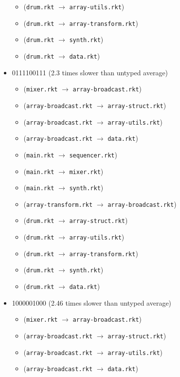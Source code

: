 \documentclass{article}
\newcommand{\mono}[1]{\texttt{#1}}
\begin{document}
\begin{itemize}
\begin{itemize}
  \item (\mono{drum.rkt} $\rightarrow$ \mono{array-utils.rkt})
  \item (\mono{drum.rkt} $\rightarrow$ \mono{array-transform.rkt})
  \item (\mono{drum.rkt} $\rightarrow$ \mono{synth.rkt})
  \item (\mono{drum.rkt} $\rightarrow$ \mono{data.rkt})
  \end{itemize}
\item 0111100111 (2.3 times slower than untyped average)
  \begin{itemize}
  \item (\mono{mixer.rkt} $\rightarrow$ \mono{array-broadcast.rkt})
  \item (\mono{array-broadcast.rkt} $\rightarrow$ \mono{array-struct.rkt})
  \item (\mono{array-broadcast.rkt} $\rightarrow$ \mono{array-utils.rkt})
  \item (\mono{array-broadcast.rkt} $\rightarrow$ \mono{data.rkt})
  \item (\mono{main.rkt} $\rightarrow$ \mono{sequencer.rkt})
  \item (\mono{main.rkt} $\rightarrow$ \mono{mixer.rkt})
  \item (\mono{main.rkt} $\rightarrow$ \mono{synth.rkt})
  \item (\mono{array-transform.rkt} $\rightarrow$ \mono{array-broadcast.rkt})
  \item (\mono{drum.rkt} $\rightarrow$ \mono{array-struct.rkt})
  \item (\mono{drum.rkt} $\rightarrow$ \mono{array-utils.rkt})
  \item (\mono{drum.rkt} $\rightarrow$ \mono{array-transform.rkt})
  \item (\mono{drum.rkt} $\rightarrow$ \mono{synth.rkt})
  \item (\mono{drum.rkt} $\rightarrow$ \mono{data.rkt})
  \end{itemize}
\item 1000001000 (2.46 times slower than untyped average)
  \begin{itemize}
  \item (\mono{mixer.rkt} $\rightarrow$ \mono{array-broadcast.rkt})
  \item (\mono{array-broadcast.rkt} $\rightarrow$ \mono{array-struct.rkt})
  \item (\mono{array-broadcast.rkt} $\rightarrow$ \mono{array-utils.rkt})
  \item (\mono{array-broadcast.rkt} $\rightarrow$ \mono{data.rkt})

\end{itemize}
\end{itemize}
\end{document}

